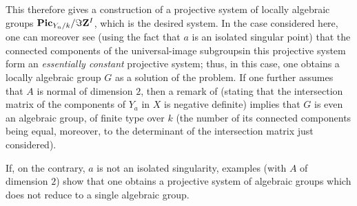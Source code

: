 This therefore gives a construction of a projective system of locally algebraic groups $\mathbf{Pic}_{Y_n/k}/\Im \mathbf Z^I$, which is the desired system. In the case considered here, one can moreover see (using the fact that $a$ is an isolated singular point) that the connected components of the universal-image subgroups\pageoriginale in this projective system form an \emph{essentially constant} projective system; thus, in this case, one obtains a locally algebraic group $G$ as a solution of the problem. If one further assumes that $A$ is normal of dimension $2$, then a remark of  (stating that the intersection matrix of the components of $Y_{a}$ in $X$ is negative definite) implies that $G$ is even an algebraic group, \ie of finite type over $k$ (the number of its connected components being equal, moreover, to the determinant of the intersection matrix just considered).

If, on the contrary, $a$ is not an isolated singularity, examples (with $A$ of dimension $2$) show that one obtains a projective system of algebraic groups which does not reduce to a single algebraic group.

